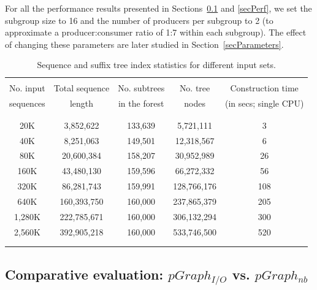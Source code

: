 \documentclass[10pt,journal,letterpaper,compsoc]{IEEEtran}
\def\colrule{\\[-7pt]\hline\\[-6pt]}
\begin{document}
For all the performance results presented in Sections~\ref{secComp} and \ref{secPerf}, we set the subgroup size to 16 and the number of producers per subgroup to 2 (to approximate a producer:consumer ratio of 1:7 within each subgroup). The effect of changing these parameters are later studied in Section~\ref{secParameters}.

\begin{table}[thb]
\begin{center}
\begin{tabular}{c|c|c|c|c|}
\colrule
No. input  & Total sequence & No. subtrees& No. tree & Construction time  \\
sequences & length & in the forest & nodes & (in secs; single CPU) \\
 \colrule
 20K & 3,852,622 & 133,639 & 5,721,111 & 3\\
 40K & 8,251,063 & 149,501 & 12,318,567 & 6 \\
 80K & 20,600,384 & 158,207 & 30,952,989 & 26\\
 160K & 43,480,130 & 159,596 & 66,272,332 & 56\\
 320K & 86,281,743 & 159,991 & 128,766,176 & 108\\
 640K & 160,393,750 & 160,000 & 237,865,379 & 205\\
 1,280K & 222,785,671 & 160,000 & 306,132,294 & 300\\
 2,560K& 392,905,218 & 160,000 & 533,746,500 & 520\\
\colrule
\end{tabular}
\end{center}
\caption{\label{tabInputTrees}
Sequence and suffix tree index statistics for different input sets.
}
\end{table}

\subsection{Comparative evaluation: $pGraph_{I/O}$ vs. $pGraph_{nb}$}
\label{secComp}
\end{document}
